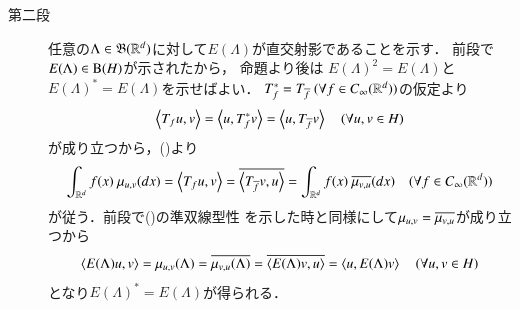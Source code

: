 \begin{prf}
\begin{description}
			\item[第二段] 任意の$\Lambda \in \mathfrak{B}(\mathbb{R}^d)$に対して$E(\Lambda)$が直交射影であることを示す．
				前段で$E(\Lambda) \in \mathrm{B}(H) $が示されたから，
				命題\label{prp:orthogonal_projection_idempotent_self_adjoint}より後は
				$E(\Lambda)^2 = E(\Lambda)$と$E(\Lambda)^* = E(\Lambda)$を示せばよい．
				$T_f^* = T_{\overline{f}}\ (\forall f \in C_\infty (\mathbb{R}^d))$の仮定より
				\begin{align}
					\inprod<T_f u,v> = \inprod<u,T_f^*v> = \inprod<u,T_{\conj{f}}v> \quad (\forall u,v \in H)
				\end{align}
				が成り立つから，()より
				\begin{align}
					\int_{\R^d} f(x)\ \mu_{u,v}(dx) = \inprod<T_f u,v> = \conj{\inprod<T_{\conj{f}}v,u>}
					= \int_{\R^d} f(x)\ \conj{\mu_{v,u}}(dx)
					\quad (\forall f \in \cvan{\R^d})
				\end{align}
				が従う．前段で()の準双線型性
				を示した時と同様にして$\mu_{u,v} = \overline{\mu_{v,u}}$が成り立つから
				\begin{align}
					\inprod<E(\Lambda)u,v> = \mu_{u,v}(\Lambda)
					= \conj{\mu_{v,u}(\Lambda)}
					= \conj{\inprod<E(\Lambda)v,u>}
					= \inprod<u,E(\Lambda)v>
					\quad (\forall u,v \in H)
				\end{align}
				となり$E(\Lambda)^* = E(\Lambda)$が得られる．
				
				
		\end{description}
	\end{prf}
	